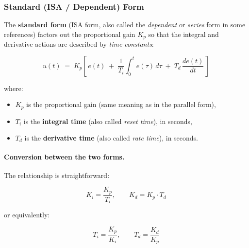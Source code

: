 \subsubsection{Standard (ISA / Dependent) Form}

The \textbf{standard form} (ISA form, also called the \emph{dependent} or \emph{series} form in some references) factors out the proportional gain $K_p$ so that the integral and derivative actions are described by \emph{time constants}:

\begin{equation}
    \boxed{u(t) \;=\; K_p \!\left[\, e(t) \;+\; \frac{1}{T_i}\!\int_0^t e(\tau)\,d\tau \;+\; T_d \,\frac{de(t)}{dt} \,\right]}
    \label{eq:pid-standard}
\end{equation}

where:
\begin{itemize}
    \item $K_p$ is the proportional gain (same meaning as in the parallel form),
    \item $T_i$ is the \textbf{integral time} (also called \emph{reset time}), in seconds,
    \item $T_d$ is the \textbf{derivative time} (also called \emph{rate time}), in seconds.
\end{itemize}

\paragraph{Conversion between the two forms.}
The relationship is straightforward:

\begin{equation}
    K_i = \frac{K_p}{T_i}, \qquad K_d = K_p \cdot T_d
    \label{eq:form-conversion}
\end{equation}

\noindent
or equivalently:

\begin{equation}
    T_i = \frac{K_p}{K_i}, \qquad T_d = \frac{K_d}{K_p}
    \label{eq:form-conversion-inv}
\end{equation}

